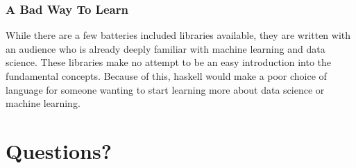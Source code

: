 \documentclass{beamer}
\begin{document}
\begin{frame}
  \frametitle{A Bad Way To Learn}
  While there are a few batteries included libraries available, they
  are written with an audience who is already deeply familiar with
  machine learning and data science.  These libraries make no attempt
  to be an easy introduction into the fundamental concepts.  Because
  of this, haskell would make a poor choice of language for someone
  wanting to start learning more about data science or machine
  learning.
\end{frame}

\section{Questions?}
\end{document}
